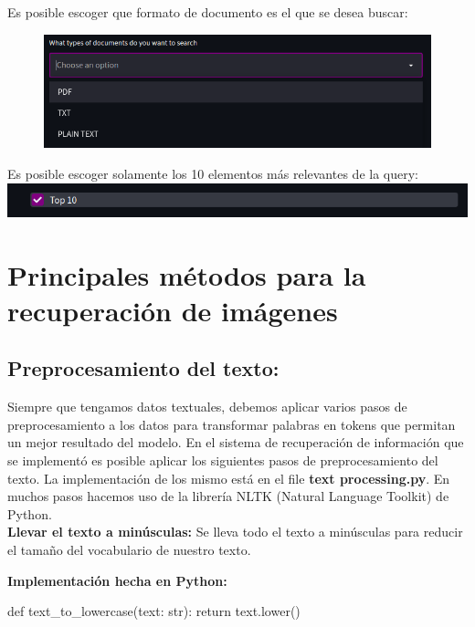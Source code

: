 \documentclass{llncs}
\begin{document}
\newpage
Es posible escoger que formato de documento es el que se desea buscar:

\begin{figure}[h]
    \includegraphics[scale = 0.8]{images/doc_format.png}
\end{figure}

Es posible escoger solamente los 10 elementos más relevantes de la query:\\

\includegraphics[scale = 0.7]{images/top_10.png}

\chapter*{Principales m\'etodos para la recuperaci\'on de im\'agenes}

\section{Preprocesamiento del texto:}

Siempre que tengamos datos textuales, debemos aplicar varios pasos de preprocesamiento a los 
datos para transformar palabras en tokens que permitan un mejor resultado del modelo.
En el sistema de recuperación de información que se implementó es posible aplicar 
los siguientes pasos de preprocesamiento del texto. La implementación de los mismo está en 
el file \textbf{text processing.py}. En muchos pasos hacemos uso de la librería NLTK (Natural Language Toolkit)
de Python.
\\

\noindent
\textbf{Llevar el texto a minúsculas:}
Se lleva todo el texto a minúsculas para reducir el tama\~{n}o del vocabulario de nuestro texto.

\noindent
\textbf{Implementación hecha en Python:}
\begin{python}
    def text_to_lowercase(text: str):
        return text.lower()
\end{python}
\end{document}
